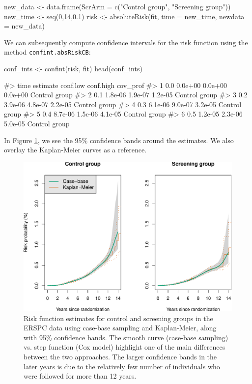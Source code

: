 \begin{Schunk}
\begin{Sinput}
new_data <- data.frame(ScrArm = c("Control group", "Screening group"))
new_time <- seq(0,14,0.1)
risk <- absoluteRisk(fit, time = new_time, newdata = new_data)
\end{Sinput}
\end{Schunk}

We can subsequently compute confidence intervals for the risk function using
the method \texttt{confint.absRiskCB}:

\begin{Schunk}
\begin{Sinput}
conf_ints <- confint(risk, fit)
head(conf_ints)
\end{Sinput}
\begin{Soutput}
#>   time estimate conf.low conf.high      cov_prof
#> 1  0.0  0.0e+00  0.0e+00   0.0e+00 Control group
#> 2  0.1  1.8e-06  1.9e-07   1.2e-05 Control group
#> 3  0.2  3.9e-06  4.8e-07   2.2e-05 Control group
#> 4  0.3  6.1e-06  9.0e-07   3.2e-05 Control group
#> 5  0.4  8.7e-06  1.5e-06   4.1e-05 Control group
#> 6  0.5  1.2e-05  2.3e-06   5.0e-05 Control group
\end{Soutput}
\end{Schunk}

In Figure \ref{fig:erspc-cif-conf}, we see the 95\% confidence bands around the estimates.
We also overlay the Kaplan-Meier curves as a reference.

\begin{figure}[ht]
\includegraphics[width=\textwidth,keepaspectratio=true]{./erspc-cif-conf-1} \caption{Risk function estimates for control and screening groups in the ERSPC data using case-base sampling and Kaplan-Meier, along with 95\% confidence bands. The smooth curve (case-base sampling) vs. step function (Cox model) highlight one of the main differences between the two approaches. The larger confidence bands in the later years is due to the relatively few number of individuals who were followed for more than 12 years.}\label{fig:erspc-cif-conf}
\end{figure}

